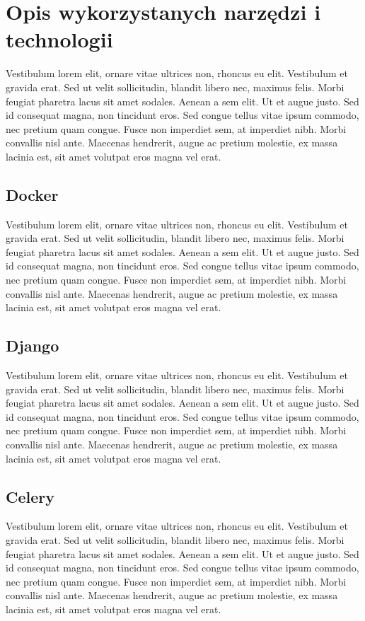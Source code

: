 \section{Opis wykorzystanych narzędzi i technologii}
Vestibulum lorem elit, ornare vitae ultrices non, rhoncus eu elit. Vestibulum et gravida erat. Sed ut velit sollicitudin, blandit libero nec, maximus felis. Morbi feugiat pharetra lacus sit amet sodales. Aenean a sem elit. Ut et augue justo. Sed id consequat magna, non tincidunt eros. Sed congue tellus vitae ipsum commodo, nec pretium quam congue. Fusce non imperdiet sem, at imperdiet nibh. Morbi convallis nisl ante. Maecenas hendrerit, augue ac pretium molestie, ex massa lacinia est, sit amet volutpat eros magna vel erat.

\subsection{Docker}
Vestibulum lorem elit, ornare vitae ultrices non, rhoncus eu elit. Vestibulum et gravida erat. Sed ut velit sollicitudin, blandit libero nec, maximus felis. Morbi feugiat pharetra lacus sit amet sodales. Aenean a sem elit. Ut et augue justo. Sed id consequat magna, non tincidunt eros. Sed congue tellus vitae ipsum commodo, nec pretium quam congue. Fusce non imperdiet sem, at imperdiet nibh. Morbi convallis nisl ante. Maecenas hendrerit, augue ac pretium molestie, ex massa lacinia est, sit amet volutpat eros magna vel erat.

\subsection{Django}
Vestibulum lorem elit, ornare vitae ultrices non, rhoncus eu elit. Vestibulum et gravida erat. Sed ut velit sollicitudin, blandit libero nec, maximus felis. Morbi feugiat pharetra lacus sit amet sodales. Aenean a sem elit. Ut et augue justo. Sed id consequat magna, non tincidunt eros. Sed congue tellus vitae ipsum commodo, nec pretium quam congue. Fusce non imperdiet sem, at imperdiet nibh. Morbi convallis nisl ante. Maecenas hendrerit, augue ac pretium molestie, ex massa lacinia est, sit amet volutpat eros magna vel erat.

\subsection{Celery}
Vestibulum lorem elit, ornare vitae ultrices non, rhoncus eu elit. Vestibulum et gravida erat. Sed ut velit sollicitudin, blandit libero nec, maximus felis. Morbi feugiat pharetra lacus sit amet sodales. Aenean a sem elit. Ut et augue justo. Sed id consequat magna, non tincidunt eros. Sed congue tellus vitae ipsum commodo, nec pretium quam congue. Fusce non imperdiet sem, at imperdiet nibh. Morbi convallis nisl ante. Maecenas hendrerit, augue ac pretium molestie, ex massa lacinia est, sit amet volutpat eros magna vel erat.

